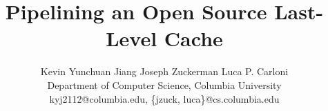 \documentclass{sig-alternate}
\begin{document}
\title{Pipelining an Open Source Last-Level Cache}

\author{
Kevin Yunchuan Jiang \qquad Joseph Zuckerman \qquad Luca P. Carloni \\
Department of Computer Science, Columbia University \\
kyj2112@columbia.edu, \{jzuck, luca\}@cs.columbia.edu 
}

\vspace{-2cm}

\maketitle

\vspace{-2cm}



\pagebreak

\end{document}
